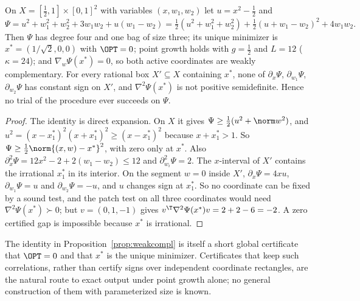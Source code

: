 \begin{proposition}\label{prop:weakcompl}
On $X=[\frac12,1]\times[0,1]^2$ with variables $(x,w_1,w_2)$ let
$u=x^2-\frac12$ and
\[
\Psi=u^2+w_1^2+w_2^2+3w_1w_2+u(w_1-w_2)
=\tfrac12(u^2+w_1^2+w_2^2)+\tfrac12(u+w_1-w_2)^2+4w_1w_2 .
\]
Then $\Psi$ has degree four and one bag of size three; its unique minimizer
is $x^*=(1/\sqrt2,0,0)$ with $\OPT=0$; point growth holds with $g=\frac12$ and
$L=12$ ($\kappa=24$); and $\nabla_w\Psi(x^*)=0$, so both active coordinates
are weakly complementary. For every rational box $X'\subseteq X$ containing
$x^*$, none of $\partial_x\Psi$, $\partial_{w_1}\Psi$, $\partial_{w_2}\Psi$ has
constant sign on $X'$, and $\nabla^2\Psi(x^*)$ is not positive semidefinite.
Hence no trial of the procedure ever succeeds on $\Psi$.
\end{proposition}

\begin{proof}
The identity is direct expansion. On $X$ it gives
$\Psi\ge\frac12(u^2+\norm w^2)$, and
$u^2=(x-x^*_1)^2(x+x^*_1)^2\ge(x-x^*_1)^2$ because $x+x^*_1>1$. So
$\Psi\ge\frac12\norm{(x,w)-x^*}^2$, with zero only at $x^*$. Also
$\partial_x^2\Psi=12x^2-2+2(w_1-w_2)\le12$ and $\partial_{w_i}^2\Psi=2$. The
$x$-interval of $X'$ contains the irrational $x^*_1$ in its interior. On the
segment $w=0$ inside $X'$, $\partial_x\Psi=4xu$, $\partial_{w_1}\Psi=u$ and
$\partial_{w_2}\Psi=-u$, and $u$ changes sign at $x^*_1$. So no coordinate can
be fixed by a sound test, and the patch test on all three coordinates would
need $\nabla^2\Psi(x^*)\succ0$; but $v=(0,1,-1)$ gives
$v^{\T}\nabla^2\Psi(x^*)v=2+2-6=-2$. A zero certified gap is impossible
because $x^*$ is irrational.
\end{proof}

The identity in Proposition~\ref{prop:weakcompl} is itself a short global
certificate that $\OPT=0$ and that $x^*$ is the unique minimizer.
Certificates that keep such correlations, rather than certify signs over
independent coordinate rectangles, are the natural route to exact output
under point growth alone; no general construction of them with parameterized
size is known.
